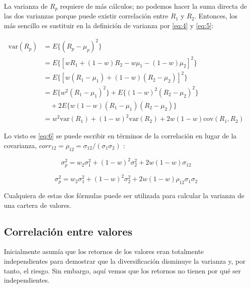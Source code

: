 La varianza de $R_{p}$ requiere de más cálculos; no podemos hacer la suma directa de las dos varianzas porque puede existir correlación entre $R_{1}$ y $R_{2}$. Entonces, los más sencillo es sustituir en la definición de varianza por \ref{eq:4} y \ref{eq:5}:

\begin{equation} \label{eq:6}
\begin{aligned}
    \text{var}(R_{p}) &= E \{(R_{p} - \mu_{p})^{2}\} \\
    &= E\{[wR_{1} + (1-w)R_{2} - w\mu_{1} - (1-w)\mu_{2}]^{2}\} \\
    &= E\{[w(R_{1} - \mu_{1}) + (1-w)(R_{2} - \mu_{2})]^{2}\} \\
    &= E\{w^{2}(R_{1}-\mu_{1})^{2}\} + E\{(1-w)^{2}(R_{2}-\mu_{2})^{2}\} \\
    &\quad + 2E\{w(1-w)(R_{1}-\mu_{1})(R_{2}-\mu_{2})\} \\
    &= w^{2}\text{var}(R_{1}) + (1-w)^{2}\text{var}(R_{2})+2w(1-w)\text{cov}(R_{1}, R_{2})
\end{aligned}
\end{equation}

Lo visto es \ref{eq:6} se puede escribir en términos de la correlación en lugar de la covarianza, $corr_{12} = \rho_{12} = \sigma_{12}/(\sigma_{1}\sigma_{2})$ \citep{wiki:covarianza_correlacion}:

\begin{equation} \label{eq:7}
	\sigma_{p}^{2} = w_{2}\sigma_{1}^{2} + (1-w)^{2}\sigma_{2}^2 + 2w(1-w)\sigma_{12}
\end{equation}

\begin{equation} \label{eq:8}
	\sigma_{p}^{2} = w_{2}\sigma_{1}^{2} + (1-w)^{2}\sigma_{2}^2 + 2w(1-w)\rho_{12} \sigma_{1}\sigma_{2}
\end{equation}
	

Cualquiera de estas dos fórmulas puede ser utilizada para calcular la varianza de una cartera de valores. 

\subsection{Correlación entre valores}

Inicialmente asumía que los retornos de los valores eran totalmente independientes para demostrar que la diversificación disminuye la varianza y, por tanto, el riesgo. Sin embargo, aquí vemos que los retornos no tienen por qué ser independientes. 

